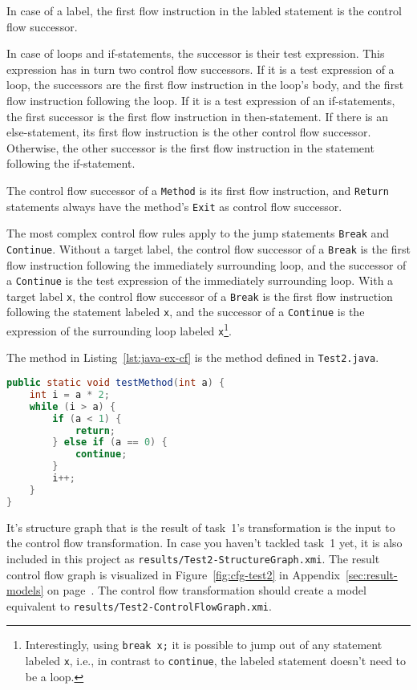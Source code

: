 \documentclass[submission,copyright,creativecommons]{eptcs}
\begin{document}
In case of a label, the first flow instruction in the labled statement is the
control flow successor.

In case of loops and if-statements, the successor is their test expression.
This expression has in turn two control flow successors.  If it is a test
expression of a loop, the successors are the first flow instruction in the
loop's body, and the first flow instruction following the loop.  If it is a
test expression of an if-statements, the first successor is the first flow
instruction in then-statement.  If there is an else-statement, its first flow
instruction is the other control flow successor.  Otherwise, the other
successor is the first flow instruction in the statement following the
if-statement.

The control flow successor of a \verb|Method| is its first flow instruction,
and \verb|Return| statements always have the method's \verb|Exit| as control
flow successor.

The most complex control flow rules apply to the jump statements \verb|Break|
and \verb|Continue|.  Without a target label, the control flow successor of a
\verb|Break| is the first flow instruction following the immediately
surrounding loop, and the successor of a \verb|Continue| is the test expression
of the immediately surrounding loop.  With a target label \verb|x|, the control
flow successor of a \verb|Break| is the first flow instruction following the
statement labeled \verb|x|, and the successor of a \verb|Continue| is the
expression of the surrounding loop labeled \verb|x|\footnote{Interestingly,
  using \texttt{break x;} it is possible to jump out of any statement labeled
  \texttt{x}, i.e., in contrast to \texttt{continue}, the labeled statement
  doesn't need to be a loop.}.


The method in Listing~\ref{lst:java-ex-cf} is the method defined in
\verb|Test2.java|.

\begin{lstlisting}[language=Java,caption={An example Java method with complex control flow (\texttt{Test2.java})},label={lst:java-ex-cf}]
public static void testMethod(int a) {
    int i = a * 2;
    while (i > a) {
        if (a < 1) {
            return;
        } else if (a == 0) {
            continue;
        }
        i++;
    }
}
\end{lstlisting}

It's structure graph that is the result of task~1's transformation is the input
to the control flow transformation.  In case you haven't tackled task~1 yet, it
is also included in this project as \verb|results/Test2-StructureGraph.xmi|.
The result control flow graph is visualized in Figure~\ref{fig:cfg-test2} in
Appendix~\ref{sec:result-models} on page~\pageref{fig:cfg-test2}.  The control
flow transformation should create a model equivalent to
\verb|results/Test2-ControlFlowGraph.xmi|.
\end{document}
